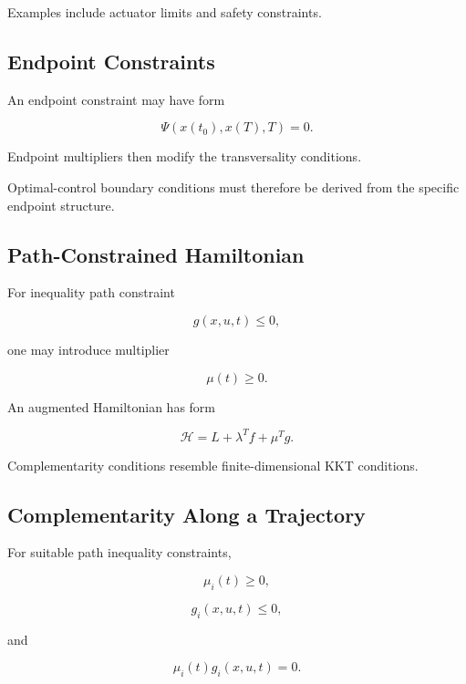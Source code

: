 Examples include actuator limits and safety constraints.

\subsection{Endpoint Constraints}
\label{subsec:endpoint-constraints}

An endpoint constraint may have form

\[
\boxed{
\Psi
(
x(t_0),
x(T),
T
)
=
0.
}
\]

Endpoint multipliers then modify the transversality conditions.

Optimal-control boundary conditions must therefore be derived from the
specific endpoint structure.

\subsection{Path-Constrained Hamiltonian}
\label{subsec:path-constrained-hamiltonian}

For inequality path constraint

\[
g(x,u,t)\leq0,
\]

one may introduce multiplier

\[
\mu(t)\geq0.
\]

An augmented Hamiltonian has form

\[
\boxed{
\mathcal{H}
=
L
+
\lambda^Tf
+
\mu^Tg.
}
\]

Complementarity conditions resemble finite-dimensional KKT conditions.

\subsection{Complementarity Along a Trajectory}
\label{subsec:path-complementarity}

For suitable path inequality constraints,

\[
\boxed{
\mu_i(t)\geq0,
}
\]

\[
\boxed{
g_i(x,u,t)\leq0,
}
\]

and

\[
\boxed{
\mu_i(t)
g_i(x,u,t)
=
0.
}
\]

